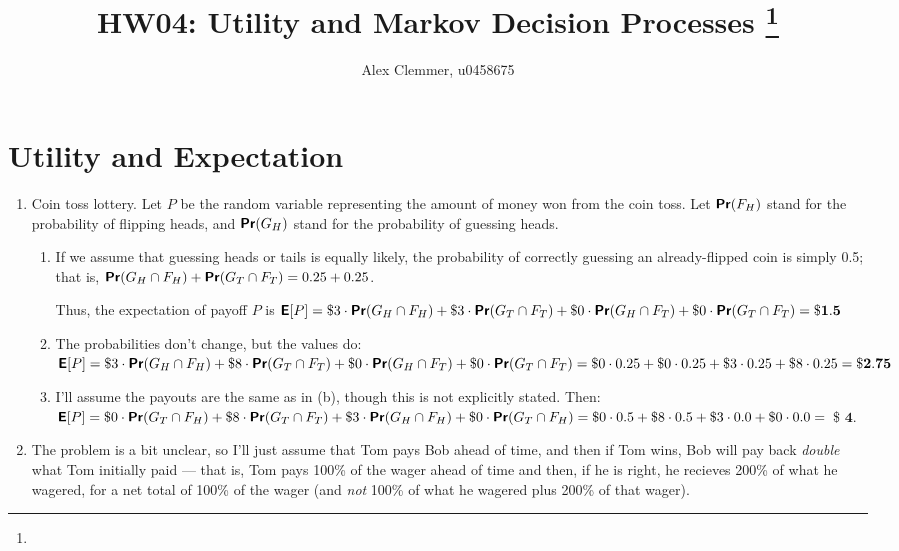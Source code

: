 \documentclass[11pt]{article}
\title{HW04: Utility and Markov Decision Processes
\footnote{\s{CS 5300 AI; \;\; Spring 2012 \hfill
Instructor: Jur van den Berg, University of Utah}
}
}
\author{Alex Clemmer, u0458675}
\newcommand{\E}{\textbf{\textsf{E}}}
\renewcommand{\Pr}{\textbf{\textsf{Pr}}}
\begin{document}
\maketitle





\section{Utility and Expectation}

\begin{enumerate}
    \item Coin toss lottery. Let $P$ be the random variable representing the amount of money won from the coin toss. Let $\Pr(F_H)$ stand for the probability of flipping heads, and $\Pr(G_H)$ stand for the probability of guessing heads. 
    
    \begin{enumerate}
      \item If we assume that guessing heads or tails is equally likely, the probability of correctly guessing an already-flipped coin is simply 0.5; that is, $\Pr(G_H \cap F_H) + \Pr(G_T \cap F_T) = 0.25 + 0.25$.
      
      Thus, the expectation of payoff $P$ is $\E[P] = \$3 \cdot \Pr(G_H \cap F_H) + \$3 \cdot \Pr(G_T \cap F_T) + \$0 \cdot \Pr(G_H \cap F_T) + \$0 \cdot \Pr(G_T \cap F_T) = \mathbf{\$1.5}$
      
      
      \item The probabilities don't change, but the values do: $\E[P] = \$3 \cdot \Pr(G_H \cap F_H) + \$8 \cdot \Pr(G_T \cap F_T) + \$0 \cdot \Pr(G_H \cap F_T) + \$0 \cdot \Pr(G_T \cap F_T) = \$0 \cdot 0.25 + \$0 \cdot 0.25 + \$3 \cdot 0.25 + \$8 \cdot 0.25 = \mathbf{\$2.75}$
      
      \item I'll assume the payouts are the same as in (b), though this is not explicitly stated. Then: $\E[P] = \$0 \cdot \Pr(G_T \cap F_H) + \$8 \cdot \Pr(G_T \cap F_T) + \$3 \cdot \Pr(G_H \cap F_H) + \$0 \cdot \Pr(G_T \cap F_H) = \$0 \cdot 0.5 + \$8 \cdot 0.5 + \$3 \cdot 0.0 + \$0 \cdot 0.0 = $ \$ $\mathbf{4}$.
    \end{enumerate}
    
    \item The problem is a bit unclear, so I'll just assume that Tom pays Bob ahead of time, and then if Tom wins, Bob will pay back \textit{double} what Tom initially paid --- that is, Tom pays 100\% of the wager ahead of time and then, if he is right, he recieves 200\% of what he wagered, for a net total of 100\% of the wager (and \textit{not} 100\% of what he wagered plus 200\% of that wager).
    

\end{enumerate}
\end{document}
